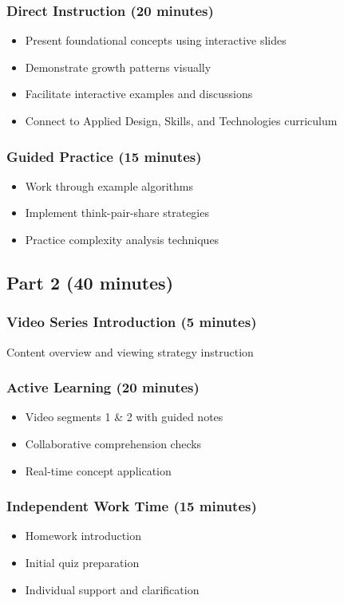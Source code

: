 \documentclass[12pt]{article}
\begin{document}
\subsubsection*{Direct Instruction (20 minutes)}
\begin{itemize}
    \item Present foundational concepts using interactive slides
    \item Demonstrate growth patterns visually
    \item Facilitate interactive examples and discussions
    \item Connect to Applied Design, Skills, and Technologies curriculum
\end{itemize}

\subsubsection*{Guided Practice (15 minutes)}
\begin{itemize}
    \item Work through example algorithms
    \item Implement think-pair-share strategies
    \item Practice complexity analysis techniques
\end{itemize}

\subsection{Part 2 (40 minutes)}

\subsubsection*{Video Series Introduction (5 minutes)}
Content overview and viewing strategy instruction

\subsubsection*{Active Learning (20 minutes)}
\begin{itemize}
    \item Video segments 1 \& 2 with guided notes
    \item Collaborative comprehension checks
    \item Real-time concept application
\end{itemize}

\subsubsection*{Independent Work Time (15 minutes)}
\begin{itemize}
    \item Homework introduction
    \item Initial quiz preparation
    \item Individual support and clarification
\end{itemize}
\end{document}
